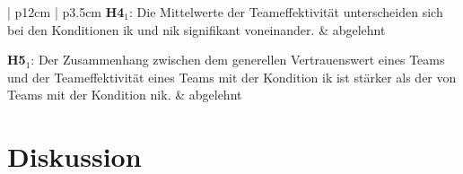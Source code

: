 \documentclass[a4paper,11pt]{article}%
\renewcommand{\\}{\vspace*{0.5\baselineskip} \newline}
\begin{document}
{{\begin{table}[H]
\begin{tabularx}{\textwidth}{| p{12cm} | p{3.5cm}}
		\hline 	\\	
		\textbf{H4$_{1}$}: Die Mittelwerte der Teameffektivität unterscheiden sich bei den Konditionen \ac{ik} und \ac{nik} signifikant voneinander.\\
		& abgelehnt\\

		\hline 	\\	
			\textbf{H5$_{1}$}: Der Zusammenhang zwischen dem generellen Vertrauenswert eines Teams und der Teameffektivität eines Teams mit der Kondition \ac{ik} ist stärker als der von Teams mit der Kondition \ac{nik}. \\
		& abgelehnt \\
		
		\hline 	\\
		
	\end{tabularx}
\end{table}		


\newpage
\section{Diskussion}

}}
\end{document}
